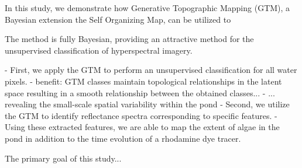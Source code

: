 \documentclass{article}
\begin{document}
In this study, we demonstrate how Generative Topographic Mapping (GTM), a Bayesian extension the Self Organizing Map, can be utilized to 

The method is fully Bayesian, providing an attractive method for the unsupervised classification of hyperspectral imagery. 

- First, we apply the GTM to perform an unsupervised classification for all water pixels. 
    - benefit: GTM classes maintain topological relationships in the latent space resulting in a smooth relationship between the obtained classes...
    - ... revealing the small-scale spatial variability within the pond
- Second, we utilize the GTM to identify reflectance spectra corresponding to specific features. 
- Using these extracted features, we are able to map the extent of algae in the pond in addition to the time evolution of a rhodamine dye tracer. 



The primary goal of this study...



\end{document}
